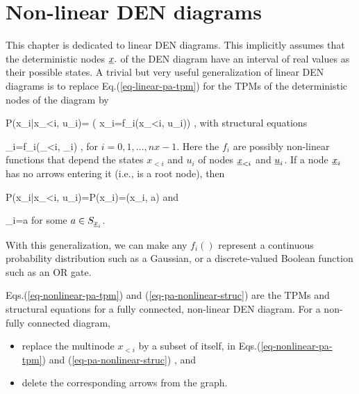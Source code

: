 \section*{Non-linear DEN diagrams}
This chapter 
is dedicated to
linear DEN diagrams. This
implicitly
assumes that 
the deterministic
nodes ${\underline{x}}.$
of the 
DEN diagram have
an interval of
real values as their
possible states.
A trivial
but very useful
generalization
of linear DEN diagrams is to
replace Eq.(\ref{eq-linear-pa-tpm})
for the TPMs
of the
deterministic nodes
of the diagram by

\beq\color{blue}
P(x_i|x_{<i}, u_i)=
\indi(
x_i=f_i(x_{<i}, u_i))
\;,
\label{eq-nonlinear-pa-tpm}
\eeq
with structural equations

\beq
\rvx_i=f_i(\rvx_{<i}, \rvu_i)
\;,
\label{eq-pa-nonlinear-struc}
\eeq
for $i=0, 1, \ldots, nx-1$.
Here the $f_i$ are 
possibly non-linear
functions
that depend
the states
$x_{<i}$ and $u_i$
of nodes ${\underline{x}}_{<i}$
and ${\underline{u}}_i$.
If a node ${\underline{x}}_i$
has no arrows
entering it (i.e., is
a root node), then

\beq\color{blue}
P(x_i|x_{<i}, u_i)=P(x_i)=\delta(x_i, a)
\eeq
and

\beq
\rvx_i=a
\eeq
for some $a\in S_{{\underline{x}}_i}$.


With this generalization,
we can make any
$f_i()$
represent a
continuous probability
distribution
such as a Gaussian,
or a discrete-valued Boolean
function
such as an OR gate.


Eqs.(\ref{eq-nonlinear-pa-tpm})
and (\ref{eq-pa-nonlinear-struc})
are the TPMs and
structural equations
for a 
fully connected, non-linear DEN diagram.
For a non-fully connected 
diagram, 
\begin{itemize}
\item
replace the multinode $x_{<i}$
by a subset of itself,
in 
Eqs.(\ref{eq-nonlinear-pa-tpm})
and (\ref{eq-pa-nonlinear-struc})
,
and
\item
delete
the corresponding arrows
from the graph.
\end{itemize}


